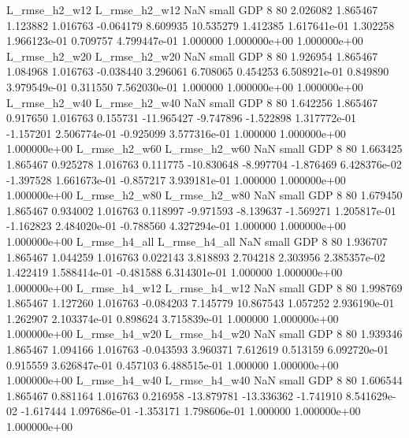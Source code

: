  L_rmse_h2_w12  L_rmse_h2_w12                   NaN      small      GDP                 8 80 2.026082       1.865467 1.123882       1.016763   -0.064179      8.609935     10.535279     1.412385   1.617641e-01  1.302258 1.966123e-01     0.709757   4.799447e-01            1.000000    1.000000e+00        1.000000e+00
 L_rmse_h2_w20  L_rmse_h2_w20                   NaN      small      GDP                 8 80 1.926954       1.865467 1.084968       1.016763   -0.038440      3.296061      6.708065     0.454253   6.508921e-01  0.849890 3.979549e-01     0.311550   7.562030e-01            1.000000    1.000000e+00        1.000000e+00
 L_rmse_h2_w40  L_rmse_h2_w40                   NaN      small      GDP                 8 80 1.642256       1.865467 0.917650       1.016763    0.155731    -11.965427     -9.747896    -1.522898   1.317772e-01 -1.157201 2.506774e-01    -0.925099   3.577316e-01            1.000000    1.000000e+00        1.000000e+00
 L_rmse_h2_w60  L_rmse_h2_w60                   NaN      small      GDP                 8 80 1.663425       1.865467 0.925278       1.016763    0.111775    -10.830648     -8.997704    -1.876469   6.428376e-02 -1.397528 1.661673e-01    -0.857217   3.939181e-01            1.000000    1.000000e+00        1.000000e+00
 L_rmse_h2_w80  L_rmse_h2_w80                   NaN      small      GDP                 8 80 1.679450       1.865467 0.934002       1.016763    0.118997     -9.971593     -8.139637    -1.569271   1.205817e-01 -1.162823 2.484020e-01    -0.788560   4.327294e-01            1.000000    1.000000e+00        1.000000e+00
 L_rmse_h4_all  L_rmse_h4_all                   NaN      small      GDP                 8 80 1.936707       1.865467 1.044259       1.016763    0.022143      3.818893      2.704218     2.303956   2.385357e-02  1.422419 1.588414e-01    -0.481588   6.314301e-01            1.000000    1.000000e+00        1.000000e+00
 L_rmse_h4_w12  L_rmse_h4_w12                   NaN      small      GDP                 8 80 1.998769       1.865467 1.127260       1.016763   -0.084203      7.145779     10.867543     1.057252   2.936190e-01  1.262907 2.103374e-01     0.898624   3.715839e-01            1.000000    1.000000e+00        1.000000e+00
 L_rmse_h4_w20  L_rmse_h4_w20                   NaN      small      GDP                 8 80 1.939346       1.865467 1.094166       1.016763   -0.043593      3.960371      7.612619     0.513159   6.092720e-01  0.915559 3.626847e-01     0.457103   6.488515e-01            1.000000    1.000000e+00        1.000000e+00
 L_rmse_h4_w40  L_rmse_h4_w40                   NaN      small      GDP                 8 80 1.606544       1.865467 0.881164       1.016763    0.216958    -13.879781    -13.336362    -1.741910   8.541629e-02 -1.617444 1.097686e-01    -1.353171   1.798606e-01            1.000000    1.000000e+00        1.000000e+00
